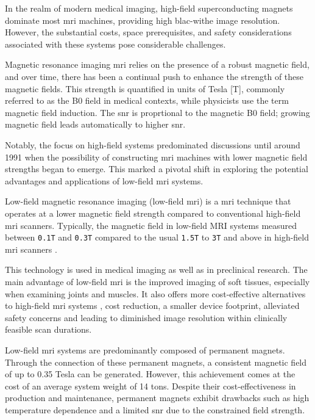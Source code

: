 In the realm of modern medical imaging, high-field superconducting
magnets dominate most \gls{mri} machines, providing high blac-withe
image resolution. However, the substantial costs, space prerequisites,
and safety considerations associated with these systems pose
considerable challenges.

Magnetic resonance imaging \gls{mri} relies on the presence of a robust
magnetic field, and over time, there has been a continual push to
enhance the strength of these magnetic fields. This strength is
quantified in units of Tesla {[}T{]}, commonly referred to as the B0
field in medical contexts, while physicists use the term magnetic field
induction. The \gls{snr} is proprtional to the magnetic B0 field;
growing magnetic field leads automatically to higher \gls{snr}.

Notably, the focus on high-field systems predominated discussions until
around 1991 when the possibility of constructing \gls{mri} machines with
lower magnetic field strengths began to emerge. This marked a pivotal
shift in exploring the potential advantages and applications of
low-field \gls{mri} systems. \cite{Nitz2016}

Low-field magnetic resonance imaging (low-field \gls{mri}) is a
\gls{mri} technique that operates at a lower magnetic field strength
compared to conventional high-field \gls{mri} scanners. Typically, the
magnetic field in low-field MRI systems measured between
\passthrough{\lstinline!0.1T!} and \passthrough{\lstinline!0.3T!}
compared to the usual \passthrough{\lstinline!1.5T!} to
\passthrough{\lstinline!3T!} and above in high-field \gls{mri} scanners
\cite{Hori2021-pt}.

This technology is used in medical imaging as well as in preclinical
research. The main advantage of low-field \gls{mri} is the improved
imaging of soft tissues, especially when examining joints and muscles.
It also offers more cost-effective alternatives to high-field \gls{mri}
systems \cite{Hori2021-pt}, cost reduction, a smaller device
footprint, alleviated safety concerns and leading to diminished image
resolution within clinically feasible scan durations.
\cite{Arnold2023-cn}

Low-field \gls{mri} systems are predominantly composed of permanent
magnets. Through the connection of these permanent magnets, a consistent
magnetic field of up to 0.35 Tesla can be generated. However, this
achievement comes at the cost of an average system weight of 14 tons.
Despite their cost-effectiveness in production and maintenance,
permanent magnets exhibit drawbacks such as high temperature dependence
and a limited \gls{snr} due to the constrained field strength.
\cite{Nitz2016}

